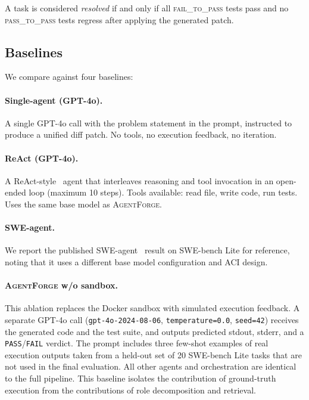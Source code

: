 \documentclass[journal]{IEEEtran}
\newcommand{\agentforge}{\textsc{AgentForge}}
\begin{document}
A task is considered \textit{resolved} if and only if all \textsc{fail\_to\_pass} tests pass and no \textsc{pass\_to\_pass} tests regress after applying the generated patch.

\subsection{Baselines}

We compare against four baselines:

\paragraph{Single-agent (GPT-4o).}
A single GPT-4o call with the problem statement in the prompt, instructed to produce a unified diff patch. No tools, no execution feedback, no iteration.

\paragraph{ReAct (GPT-4o).}
A ReAct-style~\cite{yao2023react} agent that interleaves reasoning and tool invocation in an open-ended loop (maximum 10 steps). Tools available: read file, write code, run tests. Uses the same base model as \agentforge{}.

\paragraph{SWE-agent.}
We report the published SWE-agent~\cite{yang2024sweagent} result on SWE-bench Lite for reference, noting that it uses a different base model configuration and ACI design.

\paragraph{\agentforge{} w/o sandbox.}
This ablation replaces the Docker sandbox with simulated execution feedback. A separate GPT-4o call (\texttt{gpt-4o-2024-08-06}, \texttt{temperature=0.0}, \texttt{seed=42}) receives the generated code and the test suite, and outputs predicted stdout, stderr, and a \texttt{PASS}/\texttt{FAIL} verdict. The prompt includes three few-shot examples of real execution outputs taken from a held-out set of 20 SWE-bench Lite tasks that are not used in the final evaluation. All other agents and orchestration are identical to the full pipeline. This baseline isolates the contribution of ground-truth execution from the contributions of role decomposition and retrieval.
\end{document}
